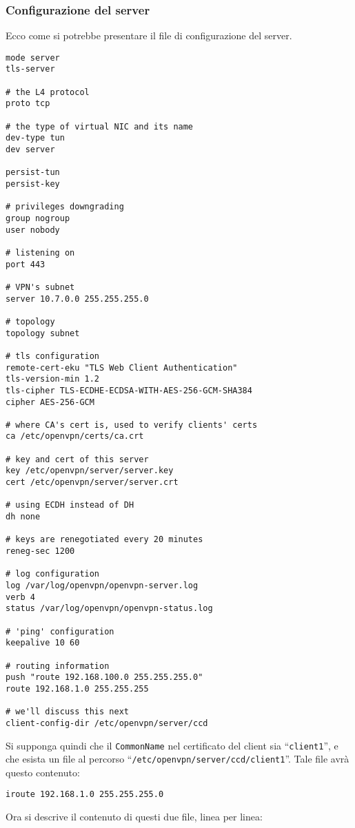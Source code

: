 \subsubsection{Configurazione del server}
Ecco come si potrebbe presentare
il file di configurazione del server.
\begin{verbatim}
mode server
tls-server

# the L4 protocol
proto tcp

# the type of virtual NIC and its name
dev-type tun
dev server

persist-tun
persist-key

# privileges downgrading
group nogroup
user nobody

# listening on
port 443

# VPN's subnet
server 10.7.0.0 255.255.255.0

# topology
topology subnet

# tls configuration
remote-cert-eku "TLS Web Client Authentication"
tls-version-min 1.2
tls-cipher TLS-ECDHE-ECDSA-WITH-AES-256-GCM-SHA384
cipher AES-256-GCM

# where CA's cert is, used to verify clients' certs
ca /etc/openvpn/certs/ca.crt

# key and cert of this server
key /etc/openvpn/server/server.key
cert /etc/openvpn/server/server.crt

# using ECDH instead of DH
dh none

# keys are renegotiated every 20 minutes
reneg-sec 1200

# log configuration
log /var/log/openvpn/openvpn-server.log
verb 4
status /var/log/openvpn/openvpn-status.log

# 'ping' configuration
keepalive 10 60

# routing information
push "route 192.168.100.0 255.255.255.0"
route 192.168.1.0 255.255.255

# we'll discuss this next
client-config-dir /etc/openvpn/server/ccd
\end{verbatim}
Si supponga quindi che il \texttt{CommonName} nel certificato del client sia
``\texttt{client1}'', e che esista un file al percorso
``\texttt{/etc/openvpn/server/ccd/client1}''. Tale file avrà questo contenuto:
\begin{verbatim}
iroute 192.168.1.0 255.255.255.0
\end{verbatim}
Ora si descrive il contenuto di questi due file, linea per linea:
